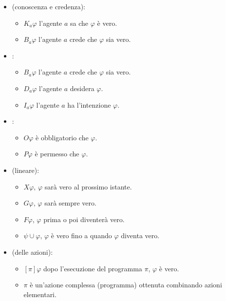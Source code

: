 \begin{itemize}
  \item {} (conoscenza e credenza):
    \begin{itemize}
      \item $K_a\varphi$ l'agente $a$ sa che $\varphi$ è vero. 
      \item $B_a\varphi$ l'agente $a$ crede che $\varphi$ sia vero.
    \end{itemize}
  \item {}:
    \begin{itemize}
      \item $B_a\varphi$ l'agente $a$ crede che $\varphi$ sia vero.
      \item $D_a\varphi$ l'agente $a$ desidera $\varphi$. 
      \item $I_a\varphi$ l'agente $a$ ha l'intenzione $\varphi$.
    \end{itemize}
  \item {}:
    \begin{itemize}
      \item $O\varphi$ è obbligatorio che $\varphi$. 
      \item $P\varphi$ è permesso che $\varphi$.
    \end{itemize}
  \item {} (lineare):
    \begin{itemize}
      \item $X\varphi$, $\varphi$ sarà vero al prossimo istante. 
      \item $G\varphi$, $\varphi$ sarà sempre vero. 
      \item $F\varphi$, $\varphi$ prima o poi diventerà vero. 
      \item $\psi \cup \varphi$, $\varphi$ è vero fino a quando $\varphi$ diventa vero. 
    \end{itemize}
  \item {} (delle azioni): 
    \begin{itemize}
      \item $[\pi]\varphi$ dopo l'esecuzione del programma $\pi$, $\varphi$ è vero. 
      \item $\pi$ è un'azione complessa (programma) ottenuta combinando azioni elementari.
    \end{itemize}
\end{itemize}

